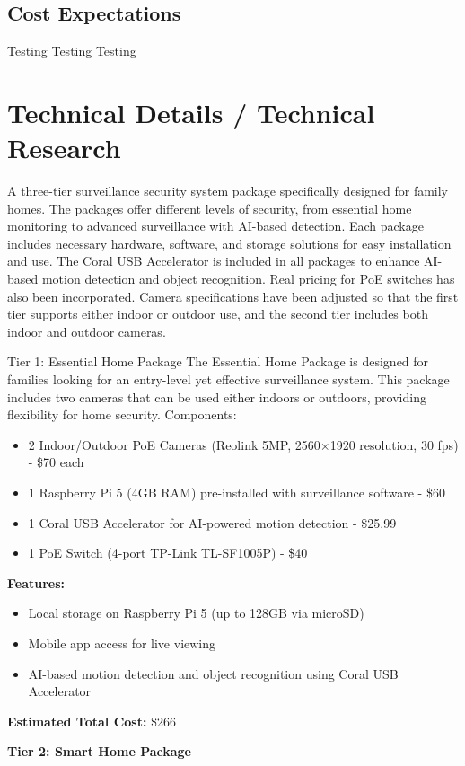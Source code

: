 \documentclass{report}
\begin{document}
\section{Cost Expectations}
Testing Testing Testing

\chapter{Technical Details / Technical Research}
A three-tier surveillance security system package specifically designed for family homes. 
The packages offer different levels of security, from essential home monitoring to advanced surveillance with AI-based detection. 
Each package includes necessary hardware, software, and storage solutions for easy installation and use. 
The Coral USB Accelerator is included in all packages to enhance AI-based motion detection and object recognition. 
Real pricing for PoE switches has also been incorporated. 
Camera specifications have been adjusted so that the first tier supports either indoor or outdoor use, and the second tier includes both indoor and outdoor cameras.

Tier 1: Essential Home Package
The Essential Home Package is designed for families looking for an entry-level yet effective surveillance system. 
This package includes two cameras that can be used either indoors or outdoors, providing flexibility for home security.
Components:
\begin{itemize}
    \item 2 Indoor/Outdoor PoE Cameras (Reolink 5MP, 2560$\times$1920 resolution, 30 fps) - \$70 each
    \item 1 Raspberry Pi 5 (4GB RAM) pre-installed with surveillance software - \$60
    \item 1 Coral USB Accelerator for AI-powered motion detection - \$25.99
    \item 1 PoE Switch (4-port TP-Link TL-SF1005P) - \$40
\end{itemize}
\textbf{Features:}
\begin{itemize}
    \item Local storage on Raspberry Pi 5 (up to 128GB via microSD)
    \item Mobile app access for live viewing
    \item AI-based motion detection and object recognition using Coral USB Accelerator
\end{itemize}
\textbf{Estimated Total Cost:} \$266

\textbf{Tier 2: Smart Home Package}
\end{document}
